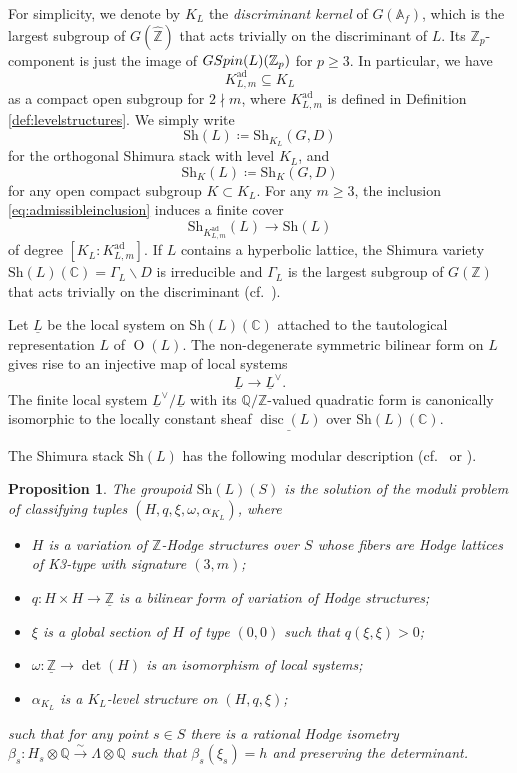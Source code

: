 \documentclass[11pt,reqno,oneside]{amsart}
\numberwithin{equation}{section}
\newtheorem{proposition}[theorem]{Proposition}
\theoremstyle{definition}
\DeclareMathOperator{\ad}{ad}
\DeclareMathOperator{\disc}{disc}
\newcommand{\GSpin}{{\rm GSpin}}
\newcommand{\Sh}{\mathrm{Sh}}
\newcommand{\CC}{\mathbb{C}}
\newcommand{\QQ}{\mathbb{Q}}
\newcommand{\ZZ}{\mathbb{Z}}
\begin{document}
For simplicity, we denote by $K_{L}$ the \textit{discriminant kernel} of $G(\mathbb{A}_f)$, which is the largest subgroup of $G(\widehat{\ZZ})$ that acts trivially on the discriminant of $L$. Its $\ZZ_{p}$-component is just the image of $\GSpin(L)(\ZZ_{p})$ for $p\geq 3$.
In particular, we have
\begin{equation}\label{eq:admissibleinclusion}
    K^{\ad}_{L,m} \subseteq K_{L}
\end{equation}
as a compact open subgroup for $2 \nmid m $, 
where $K^{\ad}_{L,m}$ is defined in Definition \ref{def:levelstructures}.
We simply write \[\Sh(L)\coloneqq \Sh_{K_{L}}(G,D)\]
for the orthogonal Shimura stack with level $K_{L}$, and
\[ 
\Sh_{K}(L) \coloneqq \Sh_K(G,D)
\]
for any open compact subgroup $K \subset K_L$.
For any $m \geq 3$, the inclusion \eqref{eq:admissibleinclusion} induces a finite cover
\[
\Sh_{K^{\ad}_{L,m}}(L) \to \Sh(L)
\]
of degree $[K_{L}: K^{\ad}_{L,m}]$.
If $L$ contains a hyperbolic lattice, the Shimura variety $\Sh(L)(\CC)=\Gamma_{L}\backslash D$ is irreducible and $\Gamma_{L}$ is the largest subgroup of $G(\ZZ)$ that acts trivially on the discriminant (cf.~\cite[(4.1)]{Pe15}).

Let $\underline{L}$ be the local system on $\Sh(L)(\CC)$ attached to the tautological representation $L$ of $\operatorname{O}(L)$. The non-degenerate symmetric bilinear form on $L$ gives rise to an injective map of local systems
$$\underline{L} \rightarrow \underline{L}^\vee.$$ The finite local system $\underline{L}^\vee/\underline{L}$ with its $\QQ/\ZZ$-valued quadratic form is canonically isomorphic to the locally constant sheaf $\underline{\disc(L)}$  over $\Sh(L)(\CC)$. 

The Shimura stack $\Sh(L)$ has the following modular description (cf.~\cite[\S 3]{MilneMotives} or \cite[Lemma 4.4.4]{BindtThesis}).
\begin{proposition}\label{prop:modularshimura}
The groupoid $\Sh(L)(S)$ is the solution of the moduli problem of classifying tuples $(H, q,\xi, \omega,\alpha_{K_{L}})$, where 
\begin{itemize}
		\item  $H$ is a variation of $\ZZ$-Hodge structures over $S$ whose fibers are Hodge lattices of K3-type with signature $(3,m)$;
		\item  $q \colon H \times H \to \underline{\ZZ}$ is a bilinear form of variation of Hodge structures;
		\item  $\xi$ is a global section of $H$ of type $(0,0)$ such that $q(\xi,\xi) >0$;
		\item $\omega \colon \underline{\ZZ} \to \det(H) $ is an isomorphism of local systems;
		\item $\alpha_{K_{L}}$ is a $K_{L}$-level structure on $(H,q, \xi)$; 

\end{itemize}
such that for any point $s \in S$ there is a rational Hodge isometry $\beta_s \colon H_s \otimes \QQ \xrightarrow{\sim } \Lambda \otimes \QQ$  such that $\beta_s(\xi_s) = h$ and preserving the determinant.
\end{proposition}
\end{document}
